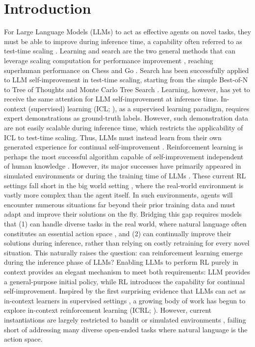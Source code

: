 \documentclass{article}
\newcommand{\0}{\mathbf{0}}
\begin{document}
\section{Introduction}
For Large Language Models (LLMs) to act as effective agents on novel tasks, they must be able to improve during inference time, a capability often referred to as test-time scaling \citep{tts}. Learning and search are the two general methods that can leverage scaling computation for performance improvement \citep{sutton2019bitter}, reaching superhuman performance on Chess \citep{campbell2002deepblue} and Go \citep{silver2016mastering}. Search has been successfully applied to LLM self-improvement in test-time scaling, starting from the simple Best-of-N \citep{best-of-n} to Tree of Thoughts \citep{tot} and Monte Carlo Tree Search \citep{everything-of-thought}.
Learning, however, has yet to receive the same attention for LLM self-improvement at inference time. In-context (supervised) learning (ICL; \citet{ICL}), as a supervised learning paradigm, requires expert demonstrations as ground-truth labels. However, such demonstration data are not easily scalable during inference time, which restricts the applicability of ICL to test-time scaling. Thus, LLMs must instead learn from their own generated experience for continual self-improvement \citep{silver2024era}.
Reinforcement learning is perhaps the most successful algorithm capable of self-improvement independent of human knowledge \citep{silver2017mastering}. However, its major successes have primarily appeared in simulated environments \citep{mnih2015human, silver2016mastering} or during the training time of LLMs \citet{guo2025deepseek}. These current RL settings fall short in the big world setting \citep{javed2024bigworld}, where the real-world environment is vastly more complex than the agent itself. In such environments, agents will encounter numerous situations far beyond their prior training data and must adapt and improve their solutions on the fly. Bridging this gap requires models that (1) can handle diverse tasks in the real world, where natural language often constitutes an essential action space \citep{silver2025welcome}, and (2) can continually improve their solutions during inference, rather than relying on costly retraining for every novel situation.
This naturally raises the question: can reinforcement learning emerge during the inference phase of LLMs? Enabling LLMs to perform RL purely in context provides an elegant mechanism to meet both requirements: LLM provides a general-purpose initial policy, while RL introduces the capability for continual self-improvement. Inspired by the first surprising evidence that LLMs can act as in-context learners in supervised settings \citep{ICL}, a growing body of work has begun to explore in-context reinforcement learning (ICRL; \citet{moeini2025survey}). However, current instantiations are largely restricted to bandit or simulated environments \citep{monea2025llmsincontextbanditreinforcement, krishnamurthy2024can}, failing short of addressing many diverse open-ended tasks where natural language is the action space.
\end{document}
